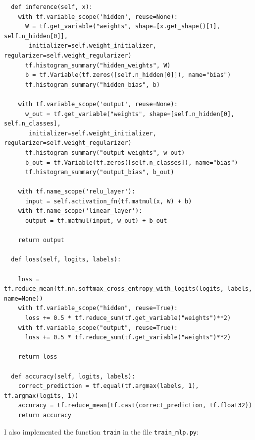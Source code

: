 \documentclass{article}
\begin{document}
\begin{small}
\begin{verbatim}
  def inference(self, x):
    with tf.variable_scope('hidden', reuse=None):
      W = tf.get_variable("weights", shape=[x.get_shape()[1], self.n_hidden[0]],
       initializer=self.weight_initializer, regularizer=self.weight_regularizer)
      tf.histogram_summary("hidden_weights", W)
      b = tf.Variable(tf.zeros([self.n_hidden[0]]), name="bias")
      tf.histogram_summary("hidden_bias", b)

    with tf.variable_scope('output', reuse=None):
      w_out = tf.get_variable("weights", shape=[self.n_hidden[0], self.n_classes],
       initializer=self.weight_initializer, regularizer=self.weight_regularizer)
      tf.histogram_summary("output_weights", w_out)
      b_out = tf.Variable(tf.zeros([self.n_classes]), name="bias")
      tf.histogram_summary("output_bias", b_out)

    with tf.name_scope('relu_layer'):
      input = self.activation_fn(tf.matmul(x, W) + b)
    with tf.name_scope('linear_layer'):
      output = tf.matmul(input, w_out) + b_out

    return output
    
  def loss(self, logits, labels):

    loss = tf.reduce_mean(tf.nn.softmax_cross_entropy_with_logits(logits, labels, name=None))
    with tf.variable_scope("hidden", reuse=True):
      loss += 0.5 * tf.reduce_sum(tf.get_variable("weights")**2)
    with tf.variable_scope("output", reuse=True):
      loss += 0.5 * tf.reduce_sum(tf.get_variable("weights")**2)

    return loss
    
  def accuracy(self, logits, labels):
    correct_prediction = tf.equal(tf.argmax(labels, 1), tf.argmax(logits, 1))
    accuracy = tf.reduce_mean(tf.cast(correct_prediction, tf.float32))
    return accuracy
\end{verbatim}
\end{small}
I also implemented the function \texttt{train} in the file \texttt{train\_mlp.py}:
\end{document}
